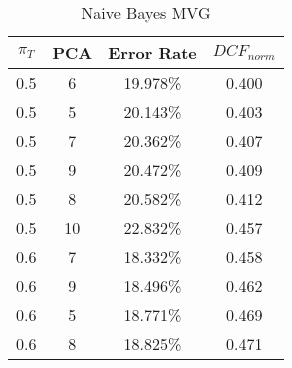 \begin{center}
\begin{longtable}{|c|c|c|c|}
\caption{Naive Bayes MVG}\label{tab:mvg_naiveacctable}\\
\hline
$\pi_T$ & PCA & Error Rate & $DCF_{norm}$\\
\hline
0.5 & 6 & 19.978\% & 0.400\\
\hline
0.5 & 5 & 20.143\% & 0.403\\
\hline
0.5 & 7 & 20.362\% & 0.407\\
\hline
0.5 & 9 & 20.472\% & 0.409\\
\hline
0.5 & 8 & 20.582\% & 0.412\\
\hline
0.5 & 10 & 22.832\% & 0.457\\
\hline
0.6 & 7 & 18.332\% & 0.458\\
\hline
0.6 & 9 & 18.496\% & 0.462\\
\hline
0.6 & 5 & 18.771\% & 0.469\\
\hline
0.6 & 8 & 18.825\% & 0.471\\
\hline
\end{longtable}
\end{center}
